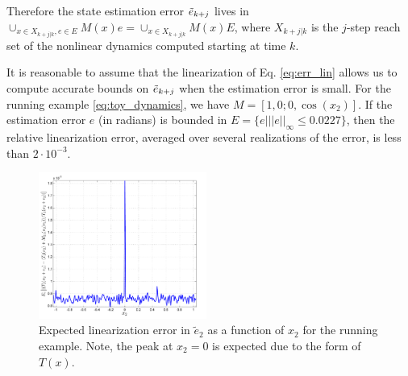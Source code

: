 Therefore the state estimation error $\tilde{e}_{k+j}$ lives in 
$\cup_{x\in X_{k+j|k}, e \in E}M(x)e = \cup_{x \in X_{k+j|k}}M(x)E$, 
where $X_{k+j|k}$ is the $j$-step reach set of the nonlinear dynamics computed starting at time $k$.

\begin{exmp}
It is reasonable to assume that the linearization of Eq. \eqref{eq:err_lin} allows us to compute accurate bounds on $\tilde{e}_{k+j}$ when the estimation error is small. 
For the running example \eqref{eq:toy_dynamics}, we have $M = [1 ,  0;0 ,\cos(x_2)]$. 
If the estimation error $e$ (in radians) is bounded in $E = \lbrace e| ||e||_{\infty} \leq 0.0227\rbrace$,
then the relative linearization error, averaged over several realizations of the error, is less than $2\cdot 10^{-3}$.
\exmend
\end{exmp}

\begin{figure}
\includegraphics[width=0.49\textwidth]{figs/Toy_LinErrEst_scissored.pdf}
\caption{Expected linearization error in $\tilde{e}_2$ as a function of $x_2$ for the running example. Note, the peak at $x_2=0$ is expected due to the form of $T(x)$. }
\label{fig:fb_err}
\end{figure}
